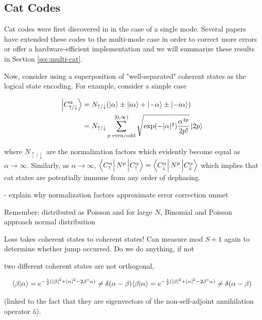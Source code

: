 \documentclass[12]{amsart}
\newcommand\0{\mathbf{0}}
\newcommand\<{\langle}
\renewcommand\>{\rangle}
\begin{document}
\subsection{Cat Codes}

Cat codes were first discovered in \cite{cochrane1999macroscopically} in the case of a single mode. Several papers have extended these codes to the multi-mode case in order to correct more errors or offer a hardware-efficient implementation\cite{albert2018multimode, leghtas2013hardware, mirrahimi2014dynamically} and we will summarize these results in Section \ref{sec:multi-cat}.

Now, consider using a superposition of "well-separated" coherent states as the logical state encoding. For example, consider a simple case

\begin{align*}
\ket{C^\alpha_{\uparrow/\downarrow}} &= N_{\uparrow /\downarrow} (\ket{\alpha} \pm \ket{i \alpha} + \ket{-\alpha} \pm \ket{-i \alpha}) \\
&= N_{\uparrow /\downarrow} \sum_{p\text{ even/odd}}^{[0, \infty)}\sqrt{\exp(-|\alpha|^2)\frac{
\alpha^{4p}}{2p!}}\ket{2p}
\end{align*}

where $N_{\uparrow /\downarrow}$ are the normalization factors which evidently become equal as $\alpha \rightarrow \infty$. Similarly, as $\alpha \rightarrow \infty$, $\bra{C^\alpha_{\uparrow}} N^p \ket{C^\alpha_{\uparrow}} = \bra{C^\alpha_{\downarrow}} N^p \ket{C^\alpha_{\downarrow}}$ which implies that cat states are potentially immune from any order of dephasing.

- explain why normalization factors approximate error correction unmet

Remember: distributed as Poisson and for large $N$, Binomial and Poisson approach normal distribution

Loss takes coherent states to coherent states! Can measure mod $S+1$ again to determine whether jump occurred. Do we do anything, if not


two different coherent states are not orthogonal,

$$
{\displaystyle \langle \beta |\alpha \rangle =e^{-{1 \over 2}(|\beta |^{2}+|\alpha |^{2}-2\beta ^{*}\alpha )}\neq \delta (\alpha -\beta )} \langle\beta|\alpha\rangle=e^{-{1\over2}(|\beta|^2+|\alpha|^2-2\beta^*\alpha)}\neq\delta(\alpha-\beta)
$$

(linked to the fact that they are eigenvectors of the non-self-adjoint annihilation operator â).
\end{document}
